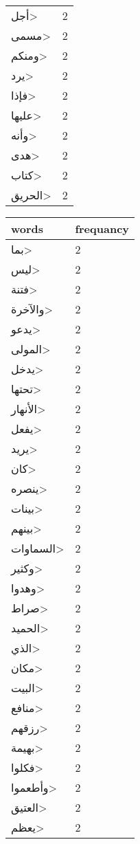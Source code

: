 \documentclass{article}
\begin{document}
\begin{multicols}{3}
\begin{center}
\begin{tabular}{ P{2cm}  P{1cm}}
\<أجل> & 2 \\ 
\<مسمى> & 2 \\ 
\<ومنكم> & 2 \\ 
\<يرد> & 2 \\ 
\<فإذا> & 2 \\ 
\<عليها> & 2 \\ 
\<وأنه> & 2 \\ 
\<هدى> & 2 \\ 
\<كتاب> & 2 \\ 
\<الحريق> & 2 \\ 
\end{tabular} 
\begin{tabular}{ P{2cm}  P{1cm}} 
\textbf{words}    & \textbf{frequancy}  \\
\hline
\<بما> & 2 \\ 
\<ليس> & 2 \\ 
\<فتنة> & 2 \\ 
\<والآخرة> & 2 \\ 
\<يدعو> & 2 \\ 
\<المولى> & 2 \\ 
\<يدخل> & 2 \\ 
\<تحتها> & 2 \\ 
\<الأنهار> & 2 \\ 
\<يفعل> & 2 \\ 
\<يريد> & 2 \\ 
\<كان> & 2 \\ 
\<ينصره> & 2 \\ 
\<بينات> & 2 \\ 
\<بينهم> & 2 \\ 
\<السماوات> & 2 \\ 
\<وكثير> & 2 \\ 
\<وهدوا> & 2 \\ 
\<صراط> & 2 \\ 
\<الحميد> & 2 \\ 
\<الذي> & 2 \\ 
\<مكان> & 2 \\ 
\<البيت> & 2 \\ 
\<منافع> & 2 \\ 
\<رزقهم> & 2 \\ 
\<بهيمة> & 2 \\ 
\<فكلوا> & 2 \\ 
\<وأطعموا> & 2 \\ 
\<العتيق> & 2 \\ 
\<يعظم> & 2 \\ 
\end{tabular} 
\begin{tabular}{ P{2cm}  P{1cm}} 

\end{tabular}
\end{center}
\end{multicols}
\end{document}

